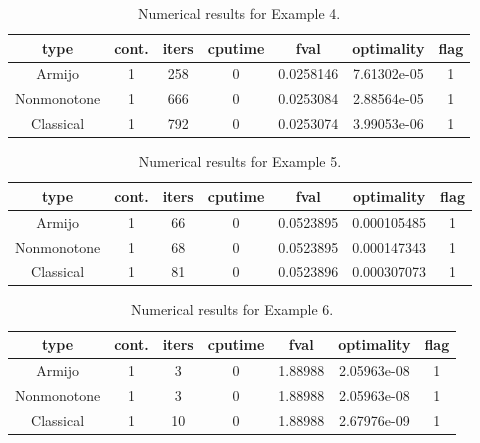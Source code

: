 \documentclass[a4paper]{article}
\newcommand{\mr}{\mathbb{R}}
\newcommand{\co}[1]{{\con{#1}}}
\begin{document}
\begin{table}[p]
  \centering
  \begin{tabular}{cc|ccccc}
    \hline
    type & cont. & iters & cputime & 
    fval & optimality & flag \\ \hline
    Armijo & 1 & 258 & 0 & 0.0258146 & 7.61302e-05 & 1 \\
    Nonmonotone & 1 & 666 & 0 & 0.0253084 & 2.88564e-05 & 1 \\
    Classical & 1 & 792 & 0 & 0.0253074 & 3.99053e-06 & 1 \\
    \hline
  \end{tabular}
  \caption{Numerical results for Example 4.}
  \label{tab4}
\end{table}




\begin{table}[p]
  \centering
  \begin{tabular}{cc|ccccc}
    \hline
    type & cont. & iters & cputime & 
    fval & optimality & flag \\ \hline
    Armijo & 1 & 66 & 0 & 0.0523895 & 0.000105485 & 1 \\
    Nonmonotone & 1 & 68 & 0 & 0.0523895 & 0.000147343 & 1 \\
    Classical & 1 & 81 & 0 & 0.0523896 & 0.000307073 & 1 \\
    \hline
  \end{tabular}
  \caption{Numerical results for Example 5.}
  \label{tab5}
\end{table}
  
  

  
  \begin{table}[p]
    \centering
    \begin{tabular}{cc|ccccc}
      \hline
      type & cont. & iters & cputime & 
      fval & optimality & flag \\ \hline
      Armijo & 1 & 3 & 0 & 1.88988 & 2.05963e-08 & 1 \\
      Nonmonotone & 1 & 3 & 0 & 1.88988 & 2.05963e-08 & 1 \\
      Classical & 1 & 10 & 0 & 1.88988 & 2.67976e-09 & 1 \\
      \hline
    \end{tabular}
    \caption{Numerical results for Example 6.}
    \label{tab6}
  \end{table}
\end{document}
